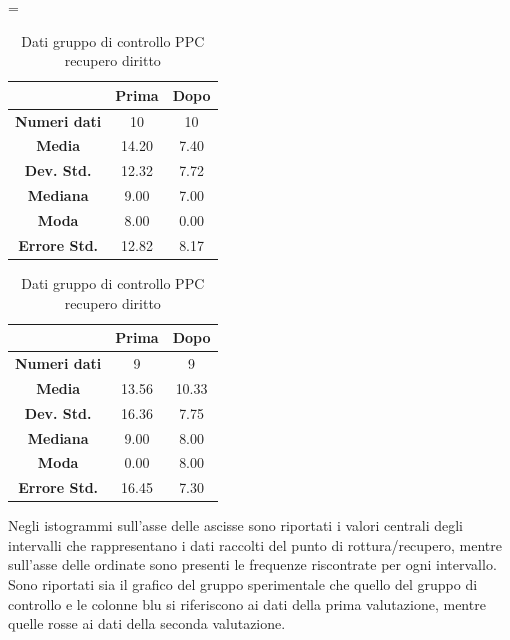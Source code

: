 \begin{table}
\centering
\setlength\tabcolsep{4pt}
\begin{minipage}{0.48\textwidth}
\centering
\tablewidth=\textwidth

\begin{tabular}{|c|c|c|} \hline
{\textbf{}} & {\textbf{  \hspace{8pt}Prima\hspace{8pt} }} & {\textbf{ \hspace{8pt}Dopo\hspace{8pt}  }}\\ \hline
\textbf{Numeri dati} & 10 & 10 \\
\textbf{Media} & 14.20 & 7.40 \\  
\textbf{Dev. Std.} & 12.32 & 7.72 \\ 
\textbf{Mediana} & 9.00 & 7.00 \\ 
\textbf{Moda} & 8.00 & 0.00 \\ 
\textbf{Errore Std.}& 12.82 & 8.17 \\ 
\hline
\end{tabular}
\caption{Dati gruppo sperimentale PPC recupero diritto}

\label{tab:accuracy} 
\end{minipage}%
\hfill
\begin{minipage}{0.48\textwidth}
\centering

\begin{tabular}{|c|c|c|} \hline
{\textbf{}} & {\textbf{  \hspace{8pt}Prima\hspace{8pt} }} & {\textbf{ \hspace{8pt}Dopo\hspace{8pt}  }}\\ \hline
\textbf{Numeri dati} & 9 & 9 \\ 
\textbf{Media} & 13.56 & 10.33 \\  
\textbf{Dev. Std.} & 16.36 & 7.75 \\  
\textbf{Mediana} & 9.00 & 8.00 \\ 
\textbf{Moda} & 0.00 & 8.00 \\ 
\textbf{Errore Std.} & 16.45 & 7.30\\ 
\hline
\end{tabular}
\caption{Dati gruppo di controllo PPC recupero diritto}

 \label{tab:ompdiff} 
\end{minipage}
\end{table}
Negli istogrammi sull’asse delle ascisse sono riportati i valori centrali degli intervalli che rappresentano i dati raccolti del punto di rottura/recupero, mentre sull’asse delle ordinate sono presenti le frequenze riscontrate per ogni intervallo. Sono riportati sia il grafico del gruppo sperimentale che quello del gruppo di controllo e le colonne blu si riferiscono ai dati della prima valutazione, mentre quelle rosse ai dati della seconda valutazione.

